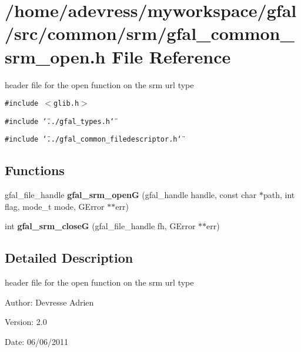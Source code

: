 \section{/home/adevress/myworkspace/gfal/src/common/srm/gfal\_\-common\_\-srm\_\-open.h File Reference}
\label{gfal__common__srm__open_8h}
header file for the open function on the srm url type 

{\tt \#include $<$glib.h$>$}\par
{\tt \#include \char`\"{}../gfal\_\-types.h\char`\"{}}\par
{\tt \#include \char`\"{}../gfal\_\-common\_\-filedescriptor.h\char`\"{}}\par
\subsection*{Functions}
\begin{CompactItemize}
\item 
gfal\_\-file\_\-handle \textbf{gfal\_\-srm\_\-open\-G} (gfal\_\-handle handle, const char $\ast$path, int flag, mode\_\-t mode, GError $\ast$$\ast$err)\label{gfal__common__srm__open_8h_bb27bc48091a2a9a4ca124a35d3847a5}

\item 
int \textbf{gfal\_\-srm\_\-close\-G} (gfal\_\-file\_\-handle fh, GError $\ast$$\ast$err)\label{gfal__common__srm__open_8h_1b78856858fbfc8244d098fef0231d7d}

\end{CompactItemize}


\subsection{Detailed Description}
header file for the open function on the srm url type 

\begin{Desc}
\item[Author:]Devresse Adrien \end{Desc}
\begin{Desc}
\item[Version:]2.0 \end{Desc}
\begin{Desc}
\item[Date:]06/06/2011 \end{Desc}

